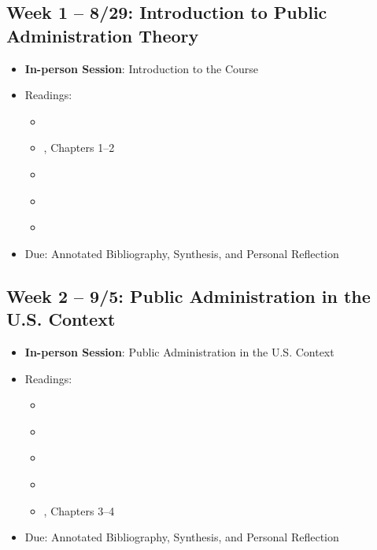 \documentclass[12pt, letterpaper]{article}
\begin{document}
\subsection*{Week 1 -- 8/29: Introduction to Public Administration Theory}
\begin{itemize}
    \item \textbf{In-person Session}: Introduction to the Course
    \item Readings:
        \begin{itemize}
            \item \cite{Weber1946}
            \item \cite{Denhardt2015}, Chapters 1--2
            \item \cite{Rosenbloom2008}
            \item \cite{Wilson1887}
            \item \cite{Wilson1989}
        \end{itemize}
    \item Due: Annotated Bibliography, Synthesis, and Personal Reflection
\end{itemize}

\subsection*{Week 2 -- 9/5: Public Administration in the U.S. Context}
\begin{itemize}
    \item \textbf{In-person Session}: Public Administration in the U.S. Context
    \item Readings:
    \begin{itemize}
        \item \cite{Allison1990}
        \item \cite{Kaufman1969}
        \item \cite{Kettl2020a}
        \item \cite{Overeem2005}
        \item \cite{Denhardt2015}, Chapters 3--4
    \end{itemize}
    \item Due: Annotated Bibliography, Synthesis, and Personal Reflection
\end{itemize}
\end{document}
